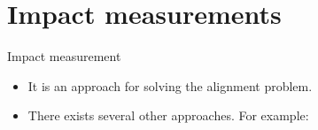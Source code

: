 \documentclass[10pt]{beamer}
\begin{document}
\section{Impact measurements}

\begin{frame}{Impact measurement}
  \begin{itemize}[<+- | alert@+>]
    \item It is an approach for solving the alignment problem.
    \item \alert<3-4>{There exists several other approaches. For example: }
  \end{itemize}
\end{frame}
\end{document}
